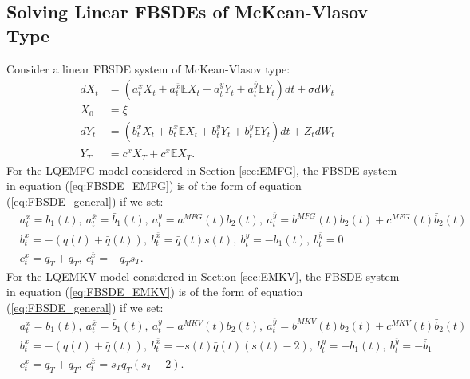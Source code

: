 \documentclass[11pt]{article}
\begin{document}
\begin{appendices}

\section{\textbf{Solving Linear FBSDEs of McKean-Vlasov Type}} \label{appendix_solving_fbsdes}

Consider a linear FBSDE system of McKean-Vlasov type:
\begin{equation}
\begin{split}
        dX_t&=\left(a^x_tX_t+a^{\bar{x}}_t \mathbb{E}X_t+a^y_tY_t+a^{\bar{y}}_t \mathbb{E}Y_t\right)dt+\sigma dW_t \\
        X_0&=\xi \\
        dY_t&=\left(b^x_tX_t+b^{\bar{x}}_t \mathbb{E}X_t+b^y_tY_t+b^{\bar{y}}_t \mathbb{E}Y_t\right)dt +Z_t dW_t \\
        Y_T&=c^xX_T+c^{\bar{x}}\mathbb{E}X_T.
\end{split}
\label{eq:FBSDE_general}
\end{equation}
For the LQEMFG model considered in Section \ref{sec:EMFG}, the FBSDE system in equation (\ref{eq:FBSDE_EMFG}) is of the form of equation (\ref{eq:FBSDE_general}) if we set:
\begin{equation*}
\begin{split}
    &a^x_t=b_1(t),\ a^{\bar{x}}_t=\bar{b}_1(t),\ a^y_t=a^{MFG}(t)b_2(t),\ a^{\bar{y}}_t=b^{MFG}(t)b_2(t)+c^{MFG}(t)\bar{b}_2(t) \\
    &b^x_t=-(q(t)+\bar{q}(t)),\ b^{\bar{x}}_t=\bar{q}(t)s(t),\ b^y_t=-b_1(t),\ b^{\bar{y}}_t=0 \\
    &c^x_t=q_T+\bar{q}_T,\ c^{\bar{x}}_t=-\bar{q}_Ts_T.
\end{split}
\end{equation*}
For the LQEMKV model considered in Section \ref{sec:EMKV}, the FBSDE system in equation (\ref{eq:FBSDE_EMKV}) is of the form of equation (\ref{eq:FBSDE_general}) if we set:
\begin{equation*}
\begin{split}
    &a^x_t=b_1(t),\ a^{\bar{x}}_t=\bar{b}_1(t),\ a^y_t=a^{MKV}(t)b_2(t),\ a^{\bar{y}}_t=b^{MKV}(t)b_2(t)+c^{MKV}(t)\bar{b}_2(t) \\
    &b^x_t=-(q(t)+\bar{q}(t)),\ b^{\bar{x}}_t=-s(t)\bar{q}(t)(s(t)-2),\ b^y_t=-b_1(t),\ b^{\bar{y}}_t=-\bar{b}_1 \\
    &c^x_t=q_T+\bar{q}_T,\ c^{\bar{x}}_t=s_T\bar{q}_T(s_T-2).
\end{split}
\end{equation*}


\end{appendices}
\end{document}
